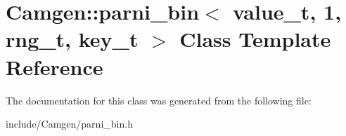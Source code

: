 \hypertarget{a00387}{\section{Camgen\-:\-:parni\-\_\-bin$<$ value\-\_\-t, 1, rng\-\_\-t, key\-\_\-t $>$ Class Template Reference}
\label{a00387}
}


The documentation for this class was generated from the following file\-:\begin{DoxyCompactItemize}
\item 
include/\-Camgen/parni\-\_\-bin.\-h\end{DoxyCompactItemize}
